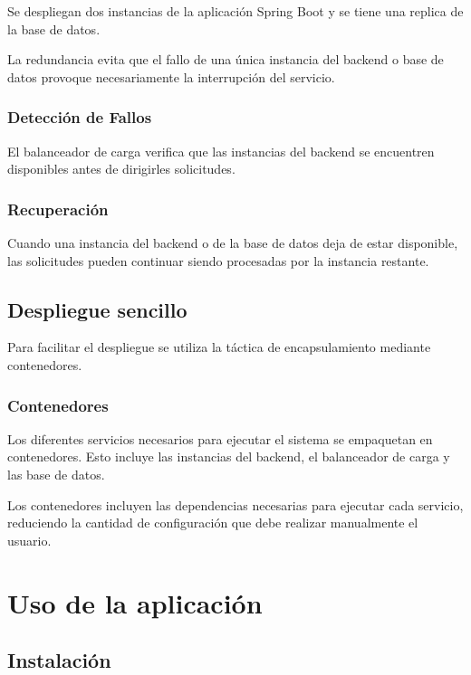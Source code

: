 \documentclass[12pt,a4paper]{article}
\begin{document}
Se despliegan dos instancias de la aplicación Spring Boot y se tiene
una replica de la base de datos.

La redundancia evita que el fallo de una única instancia del backend
o base de datos provoque necesariamente la interrupción del servicio.

\subsubsection{Detección de Fallos}

El balanceador de carga verifica que las instancias del backend se
encuentren disponibles antes de dirigirles solicitudes.

\subsubsection{Recuperación}

Cuando una instancia del backend o de la base de datos deja de estar
disponible, las solicitudes pueden continuar siendo procesadas por la
instancia restante.

\subsection{Despliegue sencillo}

Para facilitar el despliegue se utiliza la táctica de encapsulamiento
mediante contenedores.

\subsubsection{Contenedores}

Los diferentes servicios necesarios para ejecutar el sistema se
empaquetan en contenedores. Esto incluye las instancias del backend,
el balanceador de carga y las base de datos.

Los contenedores incluyen las dependencias necesarias para ejecutar
cada servicio, reduciendo la cantidad de configuración que debe
realizar manualmente el usuario.

\section{Uso de la aplicación}

\subsection{Instalación}
\end{document}
